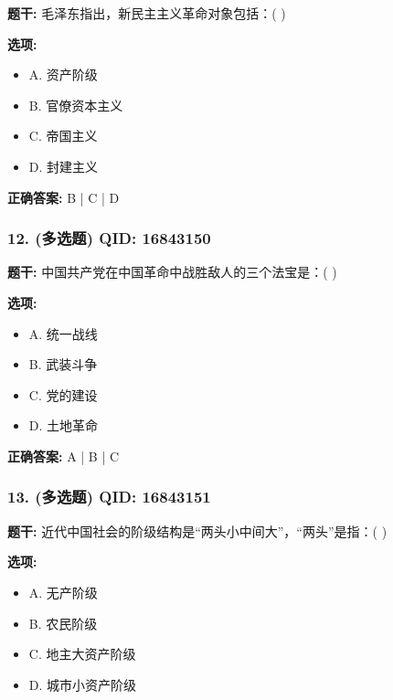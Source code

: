 \documentclass[12pt,UTF8]{ctexart}
\begin{document}
\textbf{题干:}
毛泽东指出，新民主主义革命对象包括：( )

\textbf{选项:}
\begin{itemize}[leftmargin=*]

  \item A. 资产阶级

  \item B. 官僚资本主义

  \item C. 帝国主义

  \item D. 封建主义

\end{itemize}

\textbf{正确答案:}
B | C | D

\vspace{0.3em}\hrulefill\vspace{0.7em}

\subsubsection*{12. (多选题) \small QID: 16843150}

\textbf{题干:}
中国共产党在中国革命中战胜敌人的三个法宝是：( )

\textbf{选项:}
\begin{itemize}[leftmargin=*]

  \item A. 统一战线

  \item B. 武装斗争

  \item C. 党的建设

  \item D. 土地革命

\end{itemize}

\textbf{正确答案:}
A | B | C

\vspace{0.3em}\hrulefill\vspace{0.7em}

\subsubsection*{13. (多选题) \small QID: 16843151}

\textbf{题干:}
近代中国社会的阶级结构是“两头小中间大”，“两头”是指：( )

\textbf{选项:}
\begin{itemize}[leftmargin=*]

  \item A. 无产阶级

  \item B. 农民阶级

  \item C. 地主大资产阶级

  \item D. 城市小资产阶级

\end{itemize}
\end{document}
